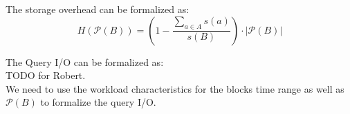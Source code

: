\documentclass{sig-alternate}
\begin{document}
The storage overhead can be formalized as:
\begin{equation}
H(\mathcal{P}(B)) = (1-\frac{\sum_{a\in A} s(a)}{s(B)})\cdot |\mathcal{P}(B)| 
\end{equation}

The Query I/O can be formalized as:\\
TODO for Robert.\\
We need to use the workload characteristics for the blocks time range as
well as $\mathcal{P}(B)$ to formalize the query I/O.\\



 
\end{document}
